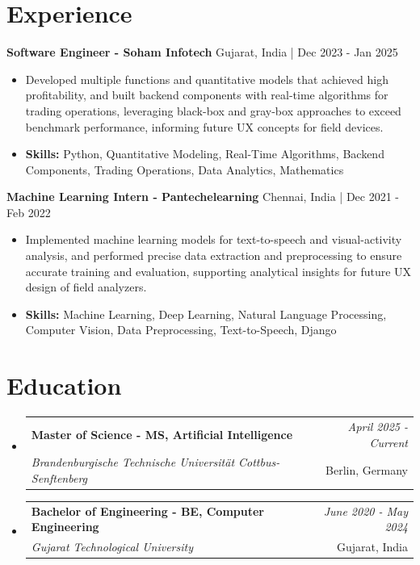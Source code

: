 \documentclass[a4paper,11pt]{article}
\makeatletter
\newcommand{\resumeSubheading}[4]{
\vspace{0.5mm}\item
    \begin{tabular*}{\linewidth}[t]{l@{\extracolsep{\fill}}r}
        \textbf{#1} & \textit{\footnotesize{#4}} \\
        \textit{\footnotesize{#3}} &  \footnotesize{#2}\\
    \end{tabular*}
    \vspace{-2.4mm}
}
\makeatother
\begin{document}
\section{\textbf{Experience}}


\vspace{1mm}
  \textbf{Software Engineer - Soham Infotech} \hfill Gujarat, India | Dec 2023 - Jan 2025
\vspace{-1.5mm} %
\begin{itemize}
  \item Developed multiple functions and quantitative models that achieved high profitability, and built backend components with real-time algorithms for trading operations, leveraging black-box and gray-box approaches to exceed benchmark performance, informing future UX concepts for field devices.

\vspace{-2mm}
  \item \textbf{Skills:} Python, Quantitative Modeling, Real-Time Algorithms, Backend Components, Trading Operations, Data Analytics, Mathematics
\end{itemize}

\vspace{1mm}
  \textbf{Machine Learning Intern - Pantechelearning} \hfill Chennai, India | Dec 2021 - Feb 2022
\vspace{-1.5mm} %
\begin{itemize}
  \item Implemented machine learning models for text-to-speech and visual-activity analysis, and performed precise data extraction and preprocessing to ensure accurate training and evaluation, supporting analytical insights for future UX design of field analyzers.
\vspace{-2mm}
  \item \textbf{Skills:} Machine Learning, Deep Learning, Natural Language Processing, Computer Vision, Data Preprocessing, Text-to-Speech, Django
\end{itemize}\section{\textbf{Education}}
\vspace{-0.4mm}

\begin{itemize}[leftmargin=0.15in, label={}]
\resumeSubheading
{Master of Science - MS, Artificial Intelligence }{Berlin, Germany}
{Brandenburgische Technische Universität Cottbus-Senftenberg  }{April 2025 - Current}

\vspace{1.0mm} %
\resumeSubheading
{Bachelor of Engineering - BE, Computer Engineering  }{Gujarat, India}
{Gujarat Technological University }{June 2020 - May 2024}

\end{itemize}
\end{document}
